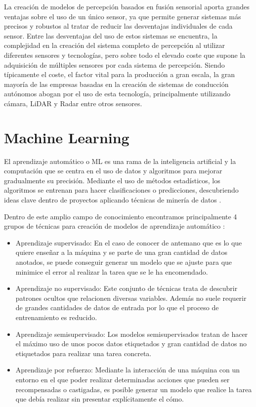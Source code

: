 La creación de modelos de percepción basados en fusión sensorial aporta grandes ventajas sobre el uso de un único sensor, ya que permite generar sistemas más precisos y robustos al tratar de reducir las desventajas individuales de cada sensor. Entre las desventajas del uso de estos sistemas se encuentra, la complejidad en la creación del sistema completo de percepción al utilizar diferentes sensores y tecnologías, pero sobre todo el elevado coste que supone la adquisición de múltiples sensores por cada sistema de percepción. Siendo típicamente el coste, el factor vital para la producción a gran escala, la gran mayoría de las empresas basadas en la creación de sistemas de conducción autónomos abogan por el uso de esta tecnología, principalmente utilizando cámara, \ac{LiDAR} y \ac{Radar} entre otros sensores.

\section{Machine Learning}
\label{sec:Machine Learning}

El aprendizaje automático o \ac{ML} es una rama de la inteligencia artificial y la computación que se centra en el uso de datos y algoritmos para mejorar gradualmente su precisión. Mediante el uso de métodos estadísticos, los algoritmos se entrenan para hacer clasificaciones o predicciones, descubriendo ideas clave dentro de proyectos aplicando técnicas de minería de datos \cite{what_ml}.

Dentro de este amplio campo de conocimiento encontramos principalmente 4 grupos de técnicas para creación de modelos de aprendizaje automático \cite{ml_techs}:

\begin{itemize}
    \item Aprendizaje supervisado: En el caso de conocer de antemano que es lo que quiere enseñar a la máquina y se parte de una gran cantidad de datos anotados, se puede conseguir generar un modelo que se ajuste para que minimice el error al realizar la tarea que se le ha encomendado.
    \item Aprendizaje no supervisado: Este conjunto de técnicas trata de descubrir patrones ocultos que relacionen diversas variables. Además no suele requerir de grandes cantidades de datos de entrada por lo que el proceso de entrenamiento es reducido.
    \item Aprendizaje semisupervisado: Los modelos semisupervisados tratan de hacer el máximo uso de unos pocos datos etiquetados y gran cantidad de datos no etiquetados para realizar una tarea concreta.
    \item Aprendizaje por refuerzo: Mediante la interacción de una máquina con un entorno en el que poder realizar determinadas acciones que pueden ser recompensadas o castigadas, es posible generar un modelo que realice la tarea que debía realizar sin presentar explícitamente el cómo.
\end{itemize}

